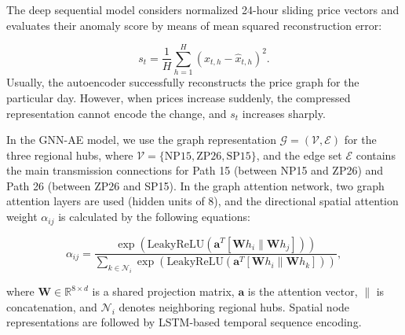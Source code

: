 \documentclass[journal]{IEEEtran}
\begin{document}
The deep sequential model considers normalized 24-hour sliding price vectors and evaluates their anomaly score by means of mean squared reconstruction error:

\begin{equation}
s_t = \frac{1}{H}\sum_{h=1}^{H}\left(x_{t,h}-\hat{x}_{t,h}\right)^2.
\label{eq:score}
\end{equation}
Usually, the autoencoder successfully reconstructs the price graph for the particular day. However, when prices increase suddenly, the compressed representation cannot encode the change, and $s_t$ increases sharply.

In the GNN-AE model, we use the graph representation $\mathcal{G} = (\mathcal{V}, \mathcal{E})$ for the three regional hubs, where $\mathcal{V} = \{\text{NP15}, \text{ZP26}, \text{SP15}\}$, and the edge set $\mathcal{E}$ contains the main transmission connections for Path 15 (between NP15 and ZP26) and Path 26 (between ZP26 and SP15). In the graph attention network, two graph attention layers are used (hidden units of 8), and the directional spatial attention weight $\alpha_{ij}$ is calculated by the following equations:

\begin{equation}
\alpha_{ij} = \frac{\exp\left(\text{LeakyReLU}\left(\mathbf{a}^T [\mathbf{W} h_i \parallel \mathbf{W} h_j]\right)\right)}{\sum_{k \in \mathcal{N}_i} \exp\left(\text{LeakyReLU}\left(\mathbf{a}^T [\mathbf{W} h_i \parallel \mathbf{W} h_k]\right)\right)},
\label{eq:gat}
\end{equation}

where $\mathbf{W} \in \mathbb{R}^{8 \times d}$ is a shared projection matrix, $\mathbf{a}$ is the attention vector, $\parallel$ is concatenation, and $\mathcal{N}_i$ denotes neighboring regional hubs. Spatial node representations are followed by LSTM-based temporal sequence encoding.
\end{document}

